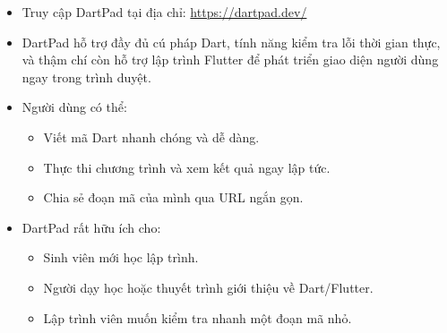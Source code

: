 \documentclass[../DoAn.tex]{subfiles}
\numberwithin{figure}{chapter}
\begin{document}
\begin{itemize}
    \item Truy cập DartPad tại địa chỉ: \url{https://dartpad.dev/}
    \item DartPad hỗ trợ đầy đủ cú pháp Dart, tính năng kiểm tra lỗi thời gian thực, và thậm chí còn hỗ trợ lập trình Flutter để phát triển giao diện người dùng ngay trong trình duyệt.
    \item Người dùng có thể:
    \begin{itemize}
        \item Viết mã Dart nhanh chóng và dễ dàng.
        \item Thực thi chương trình và xem kết quả ngay lập tức.
        \item Chia sẻ đoạn mã của mình qua URL ngắn gọn.
    \end{itemize}
    \item DartPad rất hữu ích cho:
    \begin{itemize}
        \item Sinh viên mới học lập trình.
        \item Người dạy học hoặc thuyết trình giới thiệu về Dart/Flutter.
        \item Lập trình viên muốn kiểm tra nhanh một đoạn mã nhỏ.
    \end{itemize}
\end{itemize}
\end{document}
